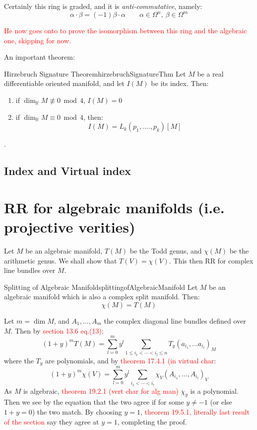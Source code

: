 \documentclass{book}
\newcommand{\R}{{\mathbb{R}}}
\renewcommand{\mod}{\,\operatorname{mod}\,}
\begin{document}
Certainly this ring is graded, and it is \emph{anti-commutative}, namely:
\[
  \alpha\cdot \beta = (-1)\beta\cdot\alpha \qquad \alpha \in \Omega^n,\ \beta \in \Omega^m
\]

\textcolor{red}{He now goes onto to prove the isomorphism between this ring and the algebraic one, skipping
for now.}

An important theorem:

\begin{thm}{Hirzebruch Signature Theorem}{hirzebruchSignatureThm}
  Let $M$ be a real differentiable oriented manifold, and let $I(M)$ be its index. Then:
  \begin{enumerate}
    \item if $\dim_\R M\not\equiv 0\mod 4$, $I(M) = 0$
    \item if $\dim_\R M\equiv 0\mod 4$, then:
      \[
        I(M) = L_k(p_1, ...., p_k)[M]
      \]
  \end{enumerate}
\end{thm}

\begin{Proof}
  \cite[p.231]{gallierComplexAlgebraicGeometry2011}.
\end{Proof}

\subsection{Index and Virtual index}

\cite[p.84-90]{hirzebruchTopologicalMethodsAlgebraic1995}

\section{RR for algebraic manifolds (i.e. projective verities)}\label{sec:RRforProjVar}

Let $M$ be an algebraic manifold, $T(M)$ be the Todd genus, and $\chi(M)$ be the arithmetic genus. We shall
show that $T(V) = \chi(V)$. This then RR for complex line bundles over $M$.

\begin{thm}{Splitting of Algebraic Manifold}{splittingofAlgebraicManifold}
  Let $M$ be an algebraic manifold which is also a complex split manifold. Then:
  \[
    \chi(M) = T(M)
  \]
\end{thm}

\begin{Proof}
  Let $m = \dim M$, and $A_1, ..., A_m$ the complex diagonal line bundles defined over $M$. Then by
  \textcolor{red}{section 13.6 eq.(13)}:
  \[
    (1+y)^m T(M) = \sum_{l=0}^my^l \sum_{1 \le i_1 < \cdots < i_l\le n} T_y(a_{i_1}, ... a_{i_l})_M
  \]
  where the $T_y$ are polynomials, and by \textcolor{red}{theorem 17.4.1 (in virtual char}:
  \[
  (1 + y)^m \chi(V) = \sum_{l=0}^m y^l \sum_{i_1 < \cdots < i_l} \chi_V(A_{i_1}, \ldots, A_{i_l})_V
  \]
  As $M$ is algebraic, \textcolor{red}{theorem 19.2.1 (vert char for alg man)} $\chi_y$ is a polynomial. Then
  we see by the equation that the two agree if for some $y\ne -1$ (or else $1+y = 0$) the two match. By
  choosing $y = 1$, \textcolor{red}{theorem 19.5.1, literally last result of the section} say they agree at
  $y=1$, completing the proof.
\end{Proof}
\end{document}
